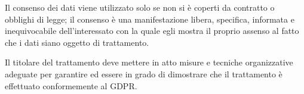 Il consenso dei dati viene utilizzato solo se non si è coperti da contratto o obblighi di legge; il consenso è una manifestazione libera, specifica, informata e inequivocabile dell'interessato con la quale egli mostra il proprio assenso al fatto che i dati siano oggetto di trattamento. 

Il titolare del trattamento deve mettere in atto misure e tecniche organizzative adeguate per garantire ed essere in grado di dimostrare che il trattamento è effettuato conformemente al GDPR. 